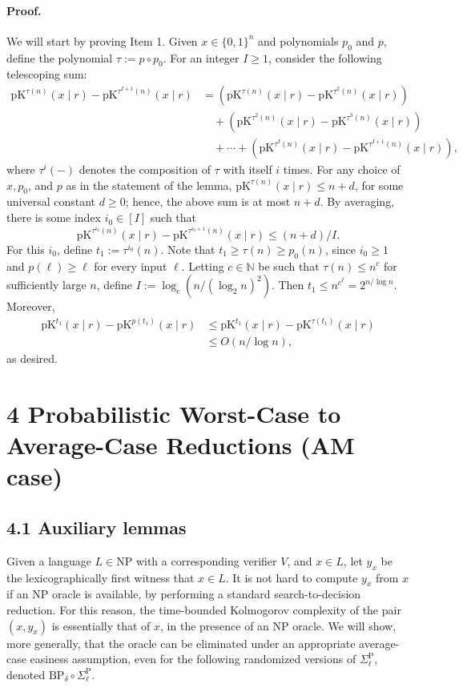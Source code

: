 \documentclass[10pt,a4paper]{article}
\begin{document}
\paragraph{Proof.} We will start by proving Item 1. Given $x\in\{0,1\}^n$ and polynomials $p_0$ and $p$, define the polynomial $\tau:=p\circ p_0$. For an integer $I\geq1$, consider the following telescoping sum:
\begin{align*}
\mathrm{pK}^{\tau(n)}(x\mid r)-\mathrm{pK}^{\tau^{I+1}(n)}(x\mid r)
&=(\mathrm{pK}^{\tau(n)}(x\mid r)-\mathrm{pK}^{\tau^2(n)}(x\mid r))\\
&\quad+(\mathrm{pK}^{\tau^2(n)}(x\mid r)-\mathrm{pK}^{\tau^3(n)}(x\mid r))\\
&\quad+\cdots+(\mathrm{pK}^{\tau^I(n)}(x\mid r)-\mathrm{pK}^{\tau^{I+1}(n)}(x\mid r)),
\end{align*}
where $\tau^i(-)$ denotes the composition of $\tau$ with itself $i$ times. For any choice of $x,p_0$, and $p$ as in the statement of the lemma, $\mathrm{pK}^{\tau(n)}(x\mid r)\leq n+d$, for some universal constant $d\geq0$; hence, the above sum is at most $n+d$. By averaging, there is some index $i_0\in[I]$ such that
\[\mathrm{pK}^{\tau^{i_0}(n)}(x\mid r)-\mathrm{pK}^{\tau^{i_0+1}(n)}(x\mid r)\leq(n+d)/I.\]
For this $i_0$, define $t_1:=\tau^{i_0}(n)$. Note that $t_1\geq\tau(n)\geq p_0(n)$, since $i_0\geq1$ and $p(\ell)\geq\ell$ for every input $\ell$. Letting $c\in\mathbb N$ be such that $\tau(n)\leq n^c$ for sufficiently large $n$, define $I:=\log_c(n/(\log_2n)^2)$. Then $t_1\leq n^{c^I}=2^{n/\log n}$. Moreover,
\begin{align*}
\mathrm{pK}^{t_1}(x\mid r)-\mathrm{pK}^{p(t_1)}(x\mid r)&\leq\mathrm{pK}^{t_1}(x\mid r)-\mathrm{pK}^{\tau(t_1)}(x\mid r)\\
&\leq O(n/\log n),
\end{align*}
as desired.

\section*{4 Probabilistic Worst-Case to Average-Case Reductions (AM case)}
\subsection*{4.1 Auxiliary lemmas}
Given a language $L\in\mathrm{NP}$ with a corresponding verifier $V$, and $x\in L$, let $y_x$ be the lexicographically first witness that $x\in L$. It is not hard to compute $y_x$ from $x$ if an NP oracle is available, by performing a standard search-to-decision reduction. For this reason, the time-bounded Kolmogorov complexity of the pair $(x,y_x)$ is essentially that of $x$, in the presence of an NP oracle. We will show, more generally, that the oracle can be eliminated under an appropriate average-case easiness assumption, even for the following randomized versions of $\Sigma_\ell^\mathrm P$, denoted $\mathrm{BP}_\delta\circ\Sigma_\ell^\mathrm P$.
\end{document}
